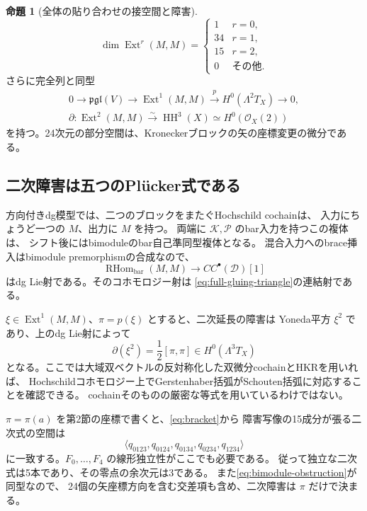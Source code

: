 \documentclass[a4paper,11pt]{ltjsarticle}
\theoremstyle{definition}
\newtheorem{theorem}{命題}[section]
\newcommand{\OO}{\mathcal O}
\newcommand{\HH}{\operatorname{HH}}
\newcommand{\Ext}{\operatorname{Ext}}
\newcommand{\RHom}{\operatorname{RHom}}
\begin{document}
\begin{theorem}[全体の貼り合わせの接空間と障害]\label{thm:bimodule-ext}
\[
 \dim\Ext^r(M,M)=
 \begin{cases}1&r=0,\\34&r=1,\\15&r=2,\\0&\text{その他}.\end{cases}
\]
さらに完全列と同型
\begin{gather}
 0\longrightarrow\mathfrak{pgl}(V)\longrightarrow\Ext^1(M,M)
 \xrightarrow{p}H^0(\Lambda^2T_X)\longrightarrow0,
 \label{eq:bimodule-tangent}\\
 \partial:\Ext^2(M,M)\xrightarrow{\sim}\HH^3(X)
 \simeq H^0(\OO_X(2))
 \label{eq:bimodule-obstruction}
\end{gather}
を持つ。24次元の部分空間は、Kroneckerブロックの矢の座標変更の微分である。
\end{theorem}

\subsection{二次障害は五つのPlücker式である}

方向付きdg模型では、二つのブロックをまたぐHochschild cochainは、
入力にちょうど一つの $M$、出力に $M$ を持つ。
両端に $\mathcal K,\mathcal P$ のbar入力を持つこの複体は、
シフト後にはbimoduleのbar自己準同型複体となる。
混合入力へのbrace挿入はbimodule premorphismの合成なので、
\[
 \RHom_{\mathrm{bar}}(M,M)
 \longrightarrow CC^\bullet(\mathcal D)[1]
\]
はdg Lie射である。そのコホモロジー射は
\eqref{eq:full-gluing-triangle}の連結射である。

$\xi\in\Ext^1(M,M)$、$\pi=p(\xi)$ とすると、二次延長の障害は
Yoneda平方 $\xi^2$ であり、上のdg Lie射によって
\begin{equation}\label{eq:yoneda-schouten}
 \partial(\xi^2)=\frac12[\pi,\pi]\in H^0(\Lambda^3T_X)
\end{equation}
となる。ここでは大域双ベクトルの反対称化した双微分cochainとHKRを用いれば、
Hochschildコホモロジー上でGerstenhaber括弧がSchouten括弧に対応することを確認できる。
cochainそのものの厳密な等式を用いているわけではない。

$\pi=\pi(a)$ を第2節の座標で書くと、\eqref{eq:bracket}から
障害写像の15成分が張る二次式の空間は
\[
 \langle q_{0123},q_{0124},q_{0134},q_{0234},q_{1234}\rangle
\]
に一致する。$F_0,\ldots,F_4$ の線形独立性がここでも必要である。
従って独立な二次式は5本であり、その零点の余次元は3である。
また\eqref{eq:bimodule-obstruction}が同型なので、
24個の矢座標方向を含む交差項も含め、二次障害は $\pi$ だけで決まる。
\end{document}

